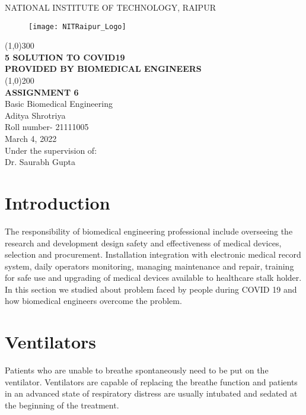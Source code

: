 \documentclass[12pt]{article}
\begin{document}
\begin{titlepage}
\begin{center}

\large{NATIONAL INSTITUTE OF TECHNOLOGY, RAIPUR}\\
[1.5mm]
\begin{figure}[h]
\centering
\texttt{[image: NITRaipur\_Logo]}
\end{figure}
\line(1,0){300}\\
[0.25in]
\LARGE{\bfseries 5 SOLUTION TO COVID19}\\
{\bfseries PROVIDED BY BIOMEDICAL ENGINEERS}\\
[2mm]
\line(1,0){200}\\
[0.25in]
\large{\bfseries ASSIGNMENT 6}\\
{Basic Biomedical Engineering}\\
[0.75cm]
\large{Aditya Shrotriya}\\
{Roll number- 21111005}\\
{March 4, 2022}\\
[1cm]
\large{Under the supervision of:}\\
{Dr. Saurabh Gupta}

\end{center}
\end{titlepage}
\clearpage
\tableofcontents
\clearpage

\section{Introduction}

The responsibility of biomedical engineering professional include overseeing the research and development design safety and effectiveness of medical devices, selection and procurement. Installation integration with electronic medical record system, daily operators monitoring, managing maintenance and repair, training for safe use and upgrading of medical devices available to healthcare stalk holder. In this section we studied about problem faced by people during COVID 19 and how biomedical engineers overcome the problem.   

\section{Ventilators}  

Patients who are unable to breathe spontaneously need to be put on the ventilator. Ventilators are capable of replacing the breathe function and patients in an advanced state of respiratory distress are usually intubated and sedated at the beginning of the treatment. 
\end{document}
